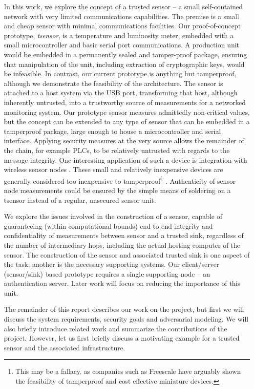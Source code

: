 In this work, we explore the concept of a trusted sensor -- a small self-contained network with very limited communications capabilities. The premise is a small and cheap sensor with minimal communications facilities. Our proof-of-concept prototype, \textit{tsensor},  is a temperature and luminosity meter, embedded with a small microcontroller and basic serial port communications. A production unit would be embedded in a permanently sealed and tamper-proof package, ensuring that manipulation of the unit, including extraction of cryptographic keys, would be infeasible. In contrast, our current prototype is anything but tamperproof, although we demonstrate the feasibility of the architecture. The sensor is attached to a host system via the USB port, transforming that host, although inherently untrusted, into a trustworthy source of measurements for a networked monitoring system.
%
Our prototype sensor measures admittedly non-critical values, but the concept can be extended to any type of sensor that can be embedded in a tamperproof package, large enough to house a microcontroller and serial interface. Applying security measures at the very source allows the remainder of the chain, for example PLCs, to be relatively untrusted with regards to the message integrity. One interesting application of such a device is integration with wireless sensor nodes \cite{}. These small and relatively inexpensive devices are generally considered too inexpensive to tamperproof\footnote{This may be a fallacy, as companies such as Freescale have arguably shown the feasibility of tamperproof and cost effective miniature devices.} \cite{}. Authenticity of sensor node measurements could be ensured by the simple means of soldering on a tsensor instead of a regular, unsecured sensor unit.

We explore the issues involved in the construction of a sensor, capable of guaranteeing (within computational bounds) end-to-end integrity and confidentiality of measurements between sensor and a trusted sink, regardless of the number of intermediary hops, including the actual hosting computer of the sensor. The construction of the sensor and associated trusted sink is one aspect of the task; another is the necessary supporting systems. Our client/server (sensor/sink) based prototype requires a single supporting node -- an authentication server. Later work will focus on reducing the importance of this unit.

The remainder of this report describes our work on the project, but first we will discuss the system requirements, security goals and adversarial modeling. We will also briefly introduce related work and summarize the contributions of the project. However, let us first briefly discuss a motivating example for a trusted sensor and the associated infrastructure.


